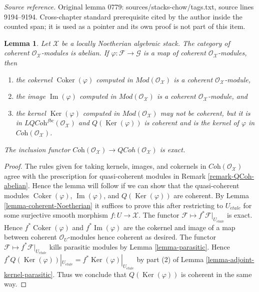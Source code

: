 \documentclass[10pt,a4paper]{amsart}
\theoremstyle{plain}
\newtheorem{lemma}[subsection]{Lemma}
\theoremstyle{definition}
\theoremstyle{remark}
\numberwithin{equation}{subsection}
\def\etale{{\acute{e}tale}}
\def\QCoh{\mathit{QCoh}}
\def\Ker{\mathop{\mathrm{Ker}}}
\def\Im{\mathop{\mathrm{Im}}}
\def\Coker{\mathop{\mathrm{Coker}}}
\begin{document}
\noindent\textit{Source reference.} Original lemma 0779: sources/stacks-chow/tags.txt, source lines 9194--9194. Cross-chapter standard prerequisite cited by the author inside the counted span; it is used as a pointer and its own proof is not part of this item.\par\medskip
\begin{lemma}
\label{lemma-coherent-abelian-Noetherian}
Let $\mathcal{X}$ be a locally Noetherian algebraic stack.
The category of coherent $\mathcal{O}_\mathcal{X}$-modules is abelian.
If $\varphi : \mathcal{F} \to \mathcal{G}$ is a map
of coherent $\mathcal{O}_\mathcal{X}$-modules, then
\begin{enumerate}
\item the cokernel $\Coker(\varphi)$ computed in
$\textit{Mod}(\mathcal{O}_\mathcal{X})$ is a coherent
$\mathcal{O}_\mathcal{X}$-module,
\item the image $\Im(\varphi)$ computed in
$\textit{Mod}(\mathcal{O}_\mathcal{X})$ is a coherent
$\mathcal{O}_\mathcal{X}$-module, and
\item the kernel $\Ker(\varphi)$ computed in
$\textit{Mod}(\mathcal{O}_\mathcal{X})$
may not be coherent, but it is
in $\textit{LQCoh}^{fbc}(\mathcal{O}_\mathcal{X})$ and $Q(\Ker(\varphi))$
is coherent and is the kernel of $\varphi$ in
$\textit{Coh}(\mathcal{O}_\mathcal{X})$.
\end{enumerate}
The inclusion functor $\textit{Coh}(\mathcal{O}_\mathcal{X}) \to
\QCoh(\mathcal{O}_\mathcal{X})$ is exact.
\end{lemma}

\begin{proof}
The rules given for taking kernels, images, and cokernels in
$\textit{Coh}(\mathcal{O}_\mathcal{X})$ agree with the prescription
for quasi-coherent modules in Remark \ref{remark-QCoh-abelian}.
Hence the lemma will follow if we can show that the quasi-coherent modules
$\Coker(\varphi)$, $\Im(\varphi)$, and $Q(\Ker(\varphi))$ are coherent.
By Lemma \ref{lemma-coherent-Noetherian} it suffices to prove this after
restricting to $U_\etale$ for some surjective smooth morphism
$f : U \to \mathcal{X}$. The functor
$\mathcal{F} \mapsto f^*\mathcal{F}|_{U_\etale}$
is exact. Hence $f^*\Coker(\varphi)$ and $f^*\Im(\varphi)$ are
the cokernel and image of a map between coherent $\mathcal{O}_U$-modules
hence coherent as desired. The functor
$\mathcal{F} \mapsto f^*\mathcal{F}|_{U_\etale}$
kills parasitic modules by Lemma \ref{lemma-parasitic}.
Hence $f^*Q(\Ker(\varphi))|_{U_\etale} = f^*\Ker(\varphi)|_{U_\etale}$
by part (2) of Lemma \ref{lemma-adjoint-kernel-parasitic}.
Thus we conclude that $Q(\Ker(\varphi))$ is coherent in the same way.
\end{proof}
\end{document}
